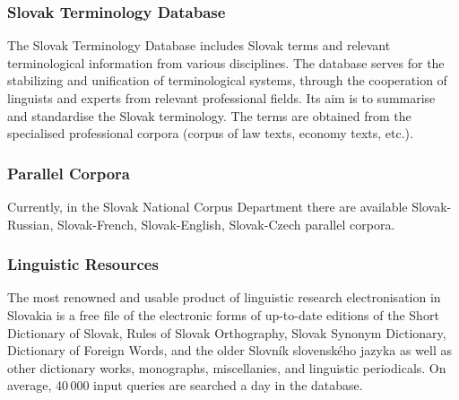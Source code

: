 \begin{multicols}{2}
\subsubsection{Slovak Terminology Database}
The Slovak Terminology Database
\cite{f15} includes Slovak terms
and relevant terminological information from various disciplines. The
database serves for the stabilizing and unification of terminological
systems, through the cooperation of linguists and experts from relevant
professional fields. Its aim is to summarise and standardise the Slovak 
terminology. The terms are obtained from the specialised professional
corpora (corpus of law texts, economy texts, etc.).

\subsubsection{Parallel Corpora}
Currently, in the Slovak National Corpus Department there are available
Slovak-Russian\cite{f16},
Slovak-French\cite{f17},
Slovak-English\cite{f18},
Slovak-Czech\cite{f19} parallel
corpora.

\subsubsection{Linguistic Resources}
The most renowned and usable product of linguistic research
electronisation in Slovakia is a free file of the electronic forms of
up-to-date editions of the Short Dictionary of Slovak, Rules of Slovak
Orthography, Slovak Synonym Dictionary, Dictionary of Foreign Words, and
the older Slovník slovenského
jazyka\cite{f20} as well as other
dictionary works, monographs, miscellanies, and linguistic
periodicals\cite{f21}. On average,
40\,000 input queries are searched a day in the database.

\end{multicols}

\clearpage

